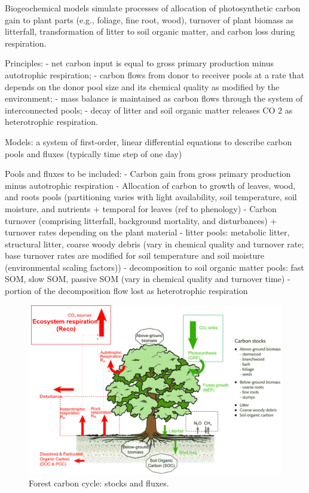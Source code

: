 \documentclass[
  12pt,
  oneside]{book}
\begin{document}
Biogeochemical models simulate processes of allocation of photosynthetic carbon gain to plant parts (e.g., foliage, fine root, wood), turnover of plant biomass as litterfall, transformation of litter to soil organic matter, and carbon loss during respiration.

Principles:
- net carbon input is equal to gross primary production minus autotrophic respiration;
- carbon flows from donor to receiver pools at a rate that depends on the donor pool size and its chemical quality as modified by the environment;
- mass balance is maintained as carbon flows through the system of interconnected pools;
- decay of litter and soil organic matter releases CO 2 as heterotrophic respiration.

Models:
a system of first-order, linear differential equations to describe carbon pools and fluxes (typically time step of one day)

Pools and fluxes to be included:
- Carbon gain from gross primary production minus autotrophic respiration
- Allocation of carbon to growth of leaves, wood, and roots pools (partitioning varies with light availability, soil temperature, soil moisture, and nutrients + temporal for leaves (ref to phenology)
- Carbon turnover (comprising litterfall, background mortality, and disturbances) + turnover rates depending on the plant material
- litter pools: metabolic litter, structural litter, coarse woody debris (vary in chemical quality and turnover rate; base turnover rates are modified for soil temperature and soil moisture (environmental scaling factors))
- decomposition to soil organic matter pools: fast SOM, slow SOM, passive SOM (vary in chemical quality and turnover time)
- portion of the decomposition flow lost as heterotrophic respiration

\begin{figure}

{\centering \includegraphics[width=0.8\linewidth]{figures/chap5/f52_stocks_fluxes} 

}

\caption{Forest carbon cycle: stocks and fluxes.}\label{fig:f52}
\end{figure}
\end{document}
